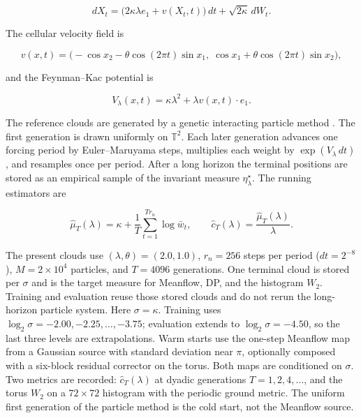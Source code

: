 \documentclass[11pt]{article}
\begin{document}
\begin{equation}
dX_t=\bigl(2\kappa\lambda e_1+v(X_t,t)\bigr)\,dt+\sqrt{2\kappa}\,dW_t.
\end{equation}

The cellular velocity field is

\begin{equation}
v(x,t)=\bigl(-\cos x_2-\theta\cos(2\pi t)\sin x_1,\;
\cos x_1+\theta\cos(2\pi t)\sin x_2\bigr),
\end{equation}

and the Feynman--Kac potential is

\begin{equation}
V_\lambda(x,t)=\kappa\lambda^2+\lambda v(x,t)\cdot e_1.
\end{equation}

The reference clouds are generated by a genetic interacting particle
method \cite{wang2022deepparticle}. The first generation is drawn
uniformly on \(\mathbb{T}^2\). Each later generation advances one forcing
period by Euler--Maruyama steps, multiplies each weight by
\(\exp(V_\lambda\,dt)\), and resamples once per period. After a long
horizon the terminal positions are stored as an empirical sample of the
invariant measure \(\eta_\lambda^\star\). The running estimators are

\begin{equation}
\hat\mu_T(\lambda)=\kappa+\frac{1}{T}\sum_{t=1}^{T r_n}\log \bar w_t,
\qquad
\hat c_T(\lambda)=\frac{\hat\mu_T(\lambda)}{\lambda}.
\end{equation}

The present clouds use \((\lambda,\theta)=(2.0,1.0)\), \(r_n=256\)
steps per period (\(dt=2^{-8}\)), \(M=2\times 10^4\) particles, and
\(T=4096\) generations. One terminal cloud is stored per \(\sigma\) and
is the target measure for Meanflow, DP, and the histogram \(W_2\).
Training and evaluation reuse those stored clouds and do not rerun the
long-horizon particle system. Here \(\sigma=\kappa\). Training uses
\(\log_2\sigma=-2.00,-2.25,\ldots,-3.75\); evaluation extends to
\(\log_2\sigma=-4.50\), so the last three levels are extrapolations. Warm
starts use the one-step Meanflow map from a Gaussian source with standard
deviation near \(\pi\), optionally composed with a six-block residual
corrector on the torus. Both maps are conditioned on \(\sigma\). Two
metrics are recorded: \(\hat c_T(\lambda)\) at dyadic generations
\(T=1,2,4,\ldots\), and the torus \(W_2\) on a \(72\times 72\) histogram
with the periodic ground metric. The uniform first generation of the
particle method is the cold start, not the Meanflow source.
\end{document}
